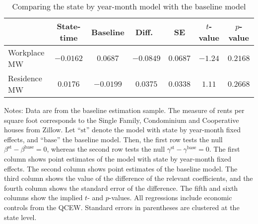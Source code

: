 \begin{table}[hbt!]
    \centering
    \caption{Comparing the state by year-month model with the baseline model}
    \label{tab:test_stateFE}

    \begin{tabular}{@{}lcccccc@{}}
        \toprule
                     & State-time & Baseline & Diff.\ & SE      & $t$-value & $p$-value \\ \midrule
        Workplace MW & $-0.0162$      & $0.0687$    &  $-0.0849$ & $0.0687$   & $-1.24$     & $0.2168$ \\
        Residence MW & $0.0176$      & $-0.0199$    &  $0.0375$ & $0.0338$   & $1.11$     & $0.2668$ \\ \bottomrule
    \end{tabular}

    \begin{minipage}{.95\textwidth} \footnotesize
        \vspace{2mm}
        Notes: 
        Data are from the baseline estimation sample.
        The measure of rents per square foot corresponds to the Single Family, 
        Condominium and Cooperative houses from Zillow.
        Let ``$\text{st}$'' denote the model with state by year-month fixed effects,
        and ``$\text{base}$'' the baseline model.
        Then, the first row tests the null $\beta^{\text{st}} - \beta^{\text{base}} = 0$,
        whereas the second row tests the null $\gamma^{\text{st}} - \gamma^{\text{base}} = 0$.
        The first column shows point estimates of the model with state by year-month 
        fixed effects.
        The second column shows point estimates of the baseline model.
        The third column shows the value of the difference of the relevant coefficients,
        and the fourth column shows the standard error of the difference.
        The fifth and sixth columns show the implied $t$- and $p$-values.
        All regressions include economic controls from the QCEW.
        Standard errors in parentheses are clustered at the state level.
    \end{minipage}
\end{table}
